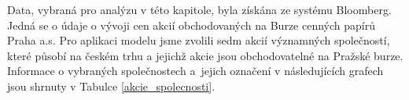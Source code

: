 \documentclass[a4paper,12pt]{report}
\theoremstyle{definition} \newtheorem{definice}[veta]{Definice}
\theoremstyle{remark}
\begin{document}
Data, vybraná pro analýzu v této kapitole, byla získána ze systému Bloomberg.
Jedná se o údaje o vývoji cen akcií obchodovaných na Burze cenných papírů Praha a.s.
Pro aplikaci modelu jsme zvolili sedm akcií významných společností, které působí na českém trhu a jejichž akcie jsou obchodovatelné na Pražské burze.
Informace o vybraných společnostech a~jejich označení v následujících grafech jsou shrnuty v Tabulce \ref{akcie_spolecnosti}.

\end{document}
